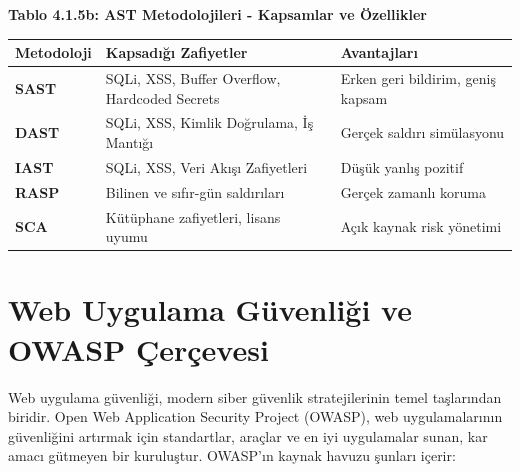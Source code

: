 \begin{center}
\textbf{Tablo 4.1.5b: AST Metodolojileri - Kapsamlar ve Özellikler}

\begin{tabular}{|p{4cm}|p{6cm}|p{4cm}|}
\hline
\hline
\textbf{Metodoloji} & \textbf{Kapsadığı Zafiyetler} & \textbf{Avantajları}  \\
\hline
\hline
\textbf{SAST} & SQLi, XSS, Buffer Overflow, Hardcoded Secrets & Erken geri bildirim, geniş kapsam  \\
\hline
\hline
\textbf{DAST} & SQLi, XSS, Kimlik Doğrulama, İş Mantığı & Gerçek saldırı simülasyonu  \\
\hline
\hline
\textbf{IAST} & SQLi, XSS, Veri Akışı Zafiyetleri & Düşük yanlış pozitif  \\
\hline
\hline
\textbf{RASP} & Bilinen ve sıfır-gün saldırıları & Gerçek zamanlı koruma  \\
\hline
\hline
\textbf{SCA} & Kütüphane zafiyetleri, lisans uyumu & Açık kaynak risk yönetimi  \\
\hline
\hline
\hline
\end{tabular}
\end{center}

\section{Web Uygulama Güvenliği ve OWASP Çerçevesi}

Web uygulama güvenliği, modern siber güvenlik stratejilerinin temel taşlarından biridir. Open Web Application Security Project (OWASP), web uygulamalarının güvenliğini artırmak için standartlar, araçlar ve en iyi uygulamalar sunan, kar amacı gütmeyen bir kuruluştur. OWASP'ın kaynak havuzu şunları içerir:

